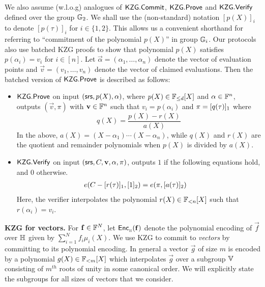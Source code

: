We also assume (w.l.o.g) analogues of $\mathsf{KZG.Commit}$, $\mathsf{KZG.Prove}$ and $\mathsf{KZG.Verify}$ defined over the group $\mathbb{G}_2$.
We shall use the (non-standard) notation $[p(X)]_i$ to denote $[p(\tau)]_i$ for $i\in \{1,2\}$.
This allows us a convenient shorthand for referring to ``commitment of the polynomial $p(X)$'' in group $\mathbb{G}_i$.
Our protocols also use batched KZG proofs to show that polynomial $p(X)$ satisfies $p(\alpha_i)=v_i$ for $i\in [n]$. Let
$\vec{\alpha}=(\alpha_1,\ldots,\alpha_n)$
denote the vector of evaluation points and $\vec{v}=(v_1,\ldots,v_n)$ denote the vector of claimed evaluations. Then the batched
version of $\mathsf{KZG.Prove}$ is described as follows:
\begin{itemize}[leftmargin=1em]
	\item $\mathsf{KZG.Prove}$ on input $(\mathsf{srs},p(X),\mathbf{\alpha})$, where $p(X) \in \mathbb{F}_{\leq d}[X]$ and $\mathbf{\alpha}\in\mathbb{F}^n$,
	outputs $(\vec{v}, \pi)$ with $\mathbf{v}\in \mathbb{F}^n$ such that $v_i=p(\alpha_i)$ and $\pi=[q(\tau)]_1$ where
	\[ q(X)=\frac{p(X)-r(X)}{a(X)} \]
	In the above, $a(X)=(X-\alpha_1)\cdots(X-\alpha_n)$, while $q(X)$ and $r(X)$ are the quotient and remainder polynomials when
	 $p(X)$ is divided by $a(X)$.
	\item $\mathsf{KZG.Verify}$ on input $(\mathsf{srs},C,\mathbf{v}, \mathbf{\alpha}, \pi)$, outputs $1$ if the following equations hold, and $0$ otherwise.
	\begin{align*}
		e(C-[r(\tau)]_1, [1]_2) &= e(\pi, [a(\tau)]_2)
	\end{align*}
	Here, the verifier interpolates the polynomial $r(X)\in \mathbb{F}_{<n}[X]$ such that $r(\alpha_i)=v_i$.
\end{itemize}

\noindent\textbf{KZG for vectors.} For $\mathbf{f}\in \mathbb{F}^N$, let $\mathsf{Enc}_{{}_{\mathbb{H}}}(\mathbf{f})$ denote the polynomial encoding of $\vec{f}$ over $\mathbb{H}$ given by $\sum_{i=1}^N f_i\mu_i(X)$.
We use KZG to commit to \emph{vectors} by committing to its polynomial encoding. In general a vector $\vec{g}$ of size $m$ is encoded by a polynomial $g(X)\in \mathbb{F}_{<m}[X]$
which interpolates $\vec{g}$ over a subgroup $\mathbb{V}$ consisting of $m^{th}$ roots of unity in some canonical order. We will explicitly state the subgroups for all sizes
of vectors that we consider.


